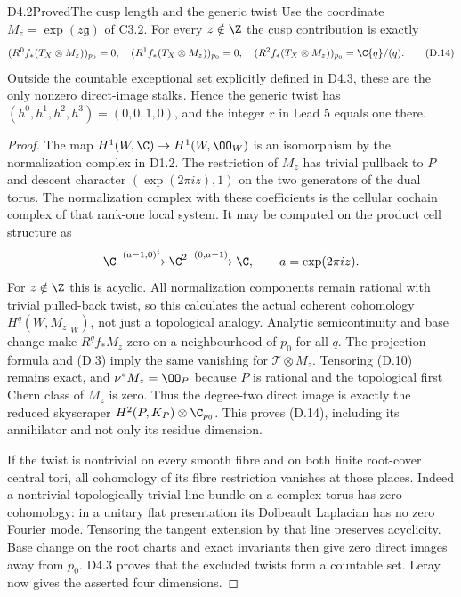 \begin{claim}{D4.2}{Proved}{The cusp length and the generic twist}
Use the coordinate $M_z=\exp(z\mathfrak g)$ of C3.2. For every
$z\notin\Z$ the cusp contribution is exactly
\[
 (R^0f_*(T_X\otimes M_z))_{p_0}=0,\quad
 (R^1f_*(T_X\otimes M_z))_{p_0}=0,\quad
 (R^2f_*(T_X\otimes M_z))_{p_0}=\C\{q\}/(q).           \tag{D.14}
\]
Outside the countable exceptional set explicitly defined in D4.3,
these are the only nonzero direct-image stalks. Hence the generic
twist has $(h^0,h^1,h^2,h^3)=(0,0,1,0)$, and the integer $r$ in
Lead 5 equals one there.
\end{claim}
\begin{proof}
The map $H^1(W,\C)\to H^1(W,\OO_W)$ is an isomorphism by the
normalization complex in D1.2. The restriction of $M_z$ has trivial
pullback to $P$ and descent character
$(\exp(2\pi iz),1)$ on the two generators of the dual torus. The
normalization complex with these coefficients is the cellular
cochain complex of that rank-one local system. It may be computed
on the product cell structure as
\[
 \C\xrightarrow{(a-1,0)^t}\C^2
 \xrightarrow{(0,a-1)}\C,
 \qquad a=\exp(2\pi iz).
\]
For $z\notin\Z$ this is acyclic. All normalization components remain
rational with trivial pulled-back twist, so this calculates the
actual coherent cohomology $H^q(W,M_z|_W)$, not just a topological
analogy. Analytic semicontinuity and base change make
$R^q\bar f_*M_z$ zero on a neighbourhood of $p_0$ for all $q$.
The projection formula and (D.3) imply the same vanishing for
$\mathcal T\otimes M_z$. Tensoring (D.10) remains exact, and
$\nu^*M_z=\OO_P$ because $P$ is rational and the topological first
Chern class of $M_z$ is zero. Thus the degree-two direct image is
exactly the reduced skyscraper $H^2(P,K_P)\otimes\C_{p_0}$.
This proves (D.14), including its annihilator and not only its residue
dimension.

If the twist is nontrivial on every smooth fibre and on both finite
root-cover central tori, all cohomology of its fibre restriction
vanishes at those places. Indeed a nontrivial topologically trivial
line bundle on a complex torus has zero cohomology: in a unitary flat
presentation its Dolbeault Laplacian has no zero Fourier mode.
Tensoring the tangent extension by that line preserves acyclicity.
Base change on the root charts and exact invariants then give zero
direct images away from $p_0$. D4.3 proves that the excluded twists
form a countable set. Leray now gives the asserted four dimensions.
\end{proof}
